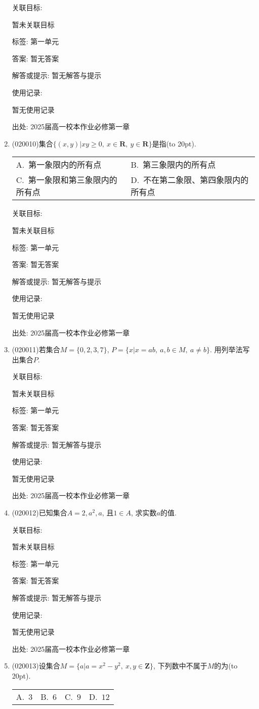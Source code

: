 \documentclass[10pt,a4paper]{article}
\newcommand{\bracket}[1]{(\hbox to #1pt{})}
\newcommand{\twoch}[4]{\par\begin{tabular}{p{.46\textwidth}p{.46\textwidth}}
A.~#1& B.~#2\\
C.~#3& D.~#4
\end{tabular}}
\newcommand{\fourch}[4]{\par\begin{tabular}{p{.23\textwidth}p{.23\textwidth}p{.23\textwidth}p{.23\textwidth}}
A.~#1 &B.~#2& C.~#3& D.~#4
\end{tabular}}
\begin{document}
\begin{enumerate}[1.]
关联目标:

暂未关联目标



标签: 第一单元

答案: 暂无答案

解答或提示: 暂无解答与提示

使用记录:

暂无使用记录


出处: 2025届高一校本作业必修第一章
\item { (020010)}集合$\{(x, y)|xy\ge 0,\  x\in\mathbf{R},\  y\in\mathbf{R}\}$是指\bracket{20}.
\twoch{第一象限内的所有点}{第三象限内的所有点}{第一象限和第三象限内的所有点}{不在第二象限、第四象限内的所有点}


关联目标:

暂未关联目标



标签: 第一单元

答案: 暂无答案

解答或提示: 暂无解答与提示

使用记录:

暂无使用记录


出处: 2025届高一校本作业必修第一章
\item { (020011)}若集合$M=\{0,2,3,7\}$, $P=\{x|x=ab,\ a,b\in M, \ a\ne b\}$. 用列举法写出集合$P$.


关联目标:

暂未关联目标



标签: 第一单元

答案: 暂无答案

解答或提示: 暂无解答与提示

使用记录:

暂无使用记录


出处: 2025届高一校本作业必修第一章
\item { (020012)}已知集合$A={2, a^2, a}$, 且$1\in A$, 求实数$a$的值.


关联目标:

暂未关联目标



标签: 第一单元

答案: 暂无答案

解答或提示: 暂无解答与提示

使用记录:

暂无使用记录


出处: 2025届高一校本作业必修第一章
\item { (020013)}设集合$M=\{a|a=x^2-y^2, \ x,y\in\mathbf{Z}\}$, 下列数中不属于$M$的为\bracket{20}.
\fourch{$3$}{$6$}{$9$}{$12$}



\end{enumerate}
\end{document}
